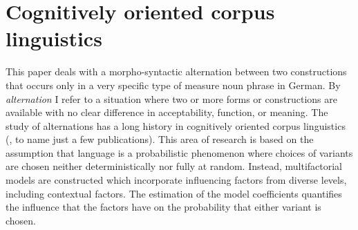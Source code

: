 \documentclass[USenglish]{article}
\begin{document}
  
\maketitle





\section{Cognitively oriented corpus linguistics}
\label{sec:cogocl}

This paper deals with a morpho-syntactic alternation between two constructions that occurs only in a very specific type of measure noun phrase in German.
By \textit{alternation} I refer to a situation where two or more forms or constructions are available with no clear difference in acceptability, function, or meaning.
The study of alternations has a long history in cognitively oriented corpus linguistics (\citealp{BresnanEa2007,BresnanHay2010,BresnanFord2010,DivjakArppe2013,Gries2015,NessetJanda2010}, to name just a few publications).
This area of research is based on the assumption that language is a probabilistic phenomenon \citep{Bresnan2007} where choices of variants are chosen neither deterministically nor fully at random.
Instead, multifactorial models are constructed which incorporate influencing factors from diverse levels, including contextual factors.
The estimation of the model coefficients quantifies the influence that the factors have on the probability that either variant is chosen.
\end{document}
